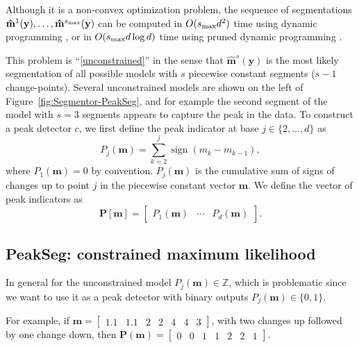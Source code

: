 \documentclass{article}
\DeclareMathOperator*{\sign}{sign}
\newcommand{\ZZ}{\mathbb Z}
\begin{document}
Although it is a non-convex optimization problem, the sequence of
segmentations $\mathbf{\hat m}^1(\mathbf y), \dots, \mathbf{\hat
  m}^{s_{\text{\text{max}}}}(\mathbf y)$ can be computed in
$O(s_{\text{\text{max}}} d^2)$ time using dynamic programming
\citep{bellman}, or in $O(s_{\text{\text{max}}} d \log d)$
time using pruned dynamic programming \citep{pruned-dp, Segmentor}.

This problem is ``\ref{unconstrained}'' in the sense that
$\mathbf{\hat m}^s(\mathbf y)$ is the most likely segmentation of all
possible models with $s$ piecewise constant segments ($s-1$
change-points). Several unconstrained models are shown on the left of
Figure~\ref{fig:Segmentor-PeakSeg}, and for example the second segment of the
model with $s=3$ segments appears to capture the peak in the data.
To construct a peak detector $c$, we first define the peak indicator at base
$j\in\{2, \dots, d\}$ as
\begin{equation}
  \label{eq:peaks}
  P_j(\mathbf m) = \sum_{k=2}^j \sign( m_{k} - m_{k-1} ),
\end{equation}
where $P_1(\mathbf m)=0$ by convention. $P_j(\mathbf m)$ is the
cumulative sum of signs of changes up to point $j$ in the piecewise
constant vector $\mathbf m$. We define the vector of peak indicators
as
\begin{equation}
  \mathbf
P[\mathbf m] = \left[\begin{array}{ccc} P_1(\mathbf m) & \cdots &
    P_d(\mathbf m)
\end{array}\right].
\end{equation}

\subsection{PeakSeg: constrained maximum likelihood}
\label{sec:constrained}

In general for the unconstrained model $P_j(\mathbf m)\in\ZZ$, which
is problematic since we want to use it as a peak detector with binary
outputs $P_j(\mathbf m)\in \{0, 1\}$. 

For example, if $\mathbf m = \left[\begin{array}{ccccccc}1.1 &
    1.1 & 2 & 2 & 4 & 4 & 3\end{array}\right]$, with two changes up
followed by one change down, then $\mathbf P(\mathbf m) =
\left[\begin{array}{ccccccc}0 & 0 & 1 & 1 & 2 & 2 &
    1 \end{array}\right]$.
\end{document}
